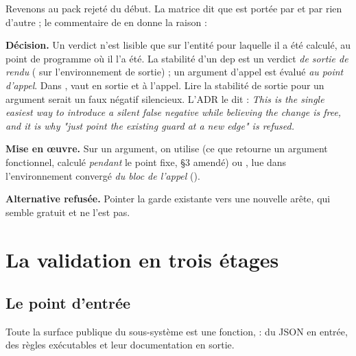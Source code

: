Revenons au pack rejeté du début. La matrice dit que  est portée par  et par rien d'autre ; le commentaire de  en donne la raison :


\begin{decision}
\textbf{Décision.} Un verdict n'est lisible que sur l'entité pour laquelle il a été calculé, au point de programme où il l'a été. La stabilité d'un dep est un verdict \emph{de sortie de rendu} ( sur l'environnement de sortie) ; un argument d'appel est évalué \emph{au point d'appel}. Dans ,  vaut  en sortie et  à l'appel. Lire la stabilité de sortie pour un argument serait un faux négatif silencieux. L'ADR le dit : \og \emph{This is the single easiest way to introduce a silent false negative while believing the change is free, and it is why "just point the existing guard at a new edge" is refused.}\fg{}

\textbf{Mise en œuvre.} Sur un argument, on utilise  (ce que retourne un argument fonctionnel, calculé \emph{pendant} le point fixe,  §3 amendé) ou , lue dans l'environnement convergé \emph{du bloc de l'appel} ().

\textbf{Alternative refusée.} \og Pointer la garde existante vers une nouvelle arête\fg{}, qui semble gratuit et ne l'est pas.
\end{decision}

\section{La validation en trois étages}
\label{sec:regles-declaratives-validation}

\subsection{Le point d'entrée}

Toute la surface publique du sous-système est une fonction,  : du JSON en entrée, des règles exécutables et leur documentation en sortie.

